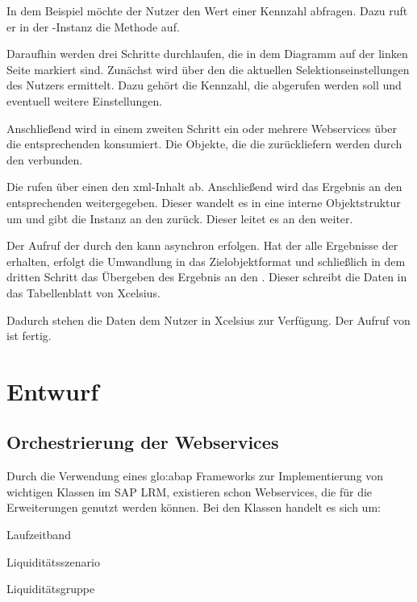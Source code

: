 \begin{onehalfspacing}
In dem Beispiel möchte der Nutzer den Wert einer Kennzahl abfragen. Dazu ruft er in der -Instanz die Methode  auf.

Daraufhin werden drei Schritte durchlaufen, die in dem Diagramm auf der linken Seite markiert sind. Zunächst wird über den  die aktuellen Selektionseinstellungen des Nutzers ermittelt. Dazu gehört die Kennzahl, die abgerufen werden soll und eventuell weitere Einstellungen.

Anschließend wird in einem zweiten Schritt ein oder mehrere Webservices über die entsprechenden  konsumiert. Die Objekte, die die  zurückliefern werden durch den  verbunden.

Die  rufen über einen  den \gls{xml}-Inhalt ab. Anschließend wird das Ergebnis an den entsprechenden  weitergegeben. Dieser wandelt es in eine interne Objektstruktur um und gibt die Instanz an den  zurück. Dieser leitet es an den  weiter.

Der Aufruf der  durch den  kann asynchron erfolgen. Hat der  alle Ergebnisse der  erhalten, erfolgt die Umwandlung in das Zielobjektformat und schließlich in dem dritten Schritt das Übergeben des Ergebnis an den . Dieser schreibt die Daten in das Tabellenblatt von \gls{Xcelsius}.

Dadurch stehen die Daten dem Nutzer in \gls{Xcelsius} zur Verfügung. Der Aufruf von  ist fertig.

\section{Entwurf}

\subsection{Orchestrierung der Webservices}
Durch die Verwendung eines \gls{glo:abap} Frameworks zur Implementierung von wichtigen Klassen im SAP LRM, existieren schon Webservices, die für die Erweiterungen genutzt werden können. Bei den Klassen handelt es sich um:

\begin{seList}
\item Laufzeitband
\item Liquiditätsszenario
\item Liquiditätsgruppe
\end{seList}


\end{onehalfspacing}
